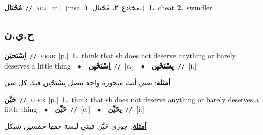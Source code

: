 \documentclass[10pt,a4paper,twoside]{article} %
\begin{document}
\begin{multicols}{2}
{\setlength\topsep{0pt}\textbf{\foreignlanguage{arabic}{مُحْتَال}}\ {\color{gray}\texttt{//}\color{black}}\ \textsc{adj}\ [m.]\ \color{gray}(msa. \foreignlanguage{arabic}{مخادع}~\foreignlanguage{arabic}{\textbf{٢.}}  \foreignlanguage{arabic}{مُحْتال}~\foreignlanguage{arabic}{\textbf{١.}})\color{black}\ \textbf{1.}~cheat  \textbf{2.}~swindler\ } \vspace{2mm}

\vspace{-3mm}
\subsection*{\color{blue}\foreignlanguage{arabic}{ح.ي.ن}\color{blue}{}} 

{\setlength\topsep{0pt}\textbf{\foreignlanguage{arabic}{اِسْتَحيَن}}\ {\color{gray}\texttt{//}\color{black}}\ \textsc{verb}\ [p.]\ \textbf{1.}~think that sb does not deserve anything or barely deserves a little thing\ \ $\bullet$\ \ \setlength\topsep{0pt}\textbf{\foreignlanguage{arabic}{اِسْتَحْيِن}}\ {\color{gray}\texttt{//}\color{black}}\ [c.]\ \ $\bullet$\ \ \setlength\topsep{0pt}\textbf{\foreignlanguage{arabic}{يِسْتَحْيِن}}\ {\color{gray}\texttt{//}\color{black}}\ [i.]\  \begin{flushright}\color{gray}\foreignlanguage{arabic}{\textbf{\underline{\foreignlanguage{arabic}{أمثلة}}}: يعني أنت متجوزة واحد بيضل يِسْتَحْيِن فيك كل شي}\end{flushright}\color{black}} \vspace{2mm}

{\setlength\topsep{0pt}\textbf{\foreignlanguage{arabic}{حَيَّن}}\ {\color{gray}\texttt{//}\color{black}}\ \textsc{verb}\ [p.]\ \textbf{1.}~think that sb does not deserve anything or barely deserves a little thing\ \ $\bullet$\ \ \setlength\topsep{0pt}\textbf{\foreignlanguage{arabic}{حَيِّن}}\ {\color{gray}\texttt{//}\color{black}}\ [c.]\ \ $\bullet$\ \ \setlength\topsep{0pt}\textbf{\foreignlanguage{arabic}{يحَيِّن}}\ {\color{gray}\texttt{//}\color{black}}\ [i.]\  \begin{flushright}\color{gray}\foreignlanguage{arabic}{\textbf{\underline{\foreignlanguage{arabic}{أمثلة}}}: جوزي حَيَّن فيني لبسة حقها خمسين شيكل}\end{flushright}\color{black}} \vspace{2mm}


\end{multicols}
\end{document}
